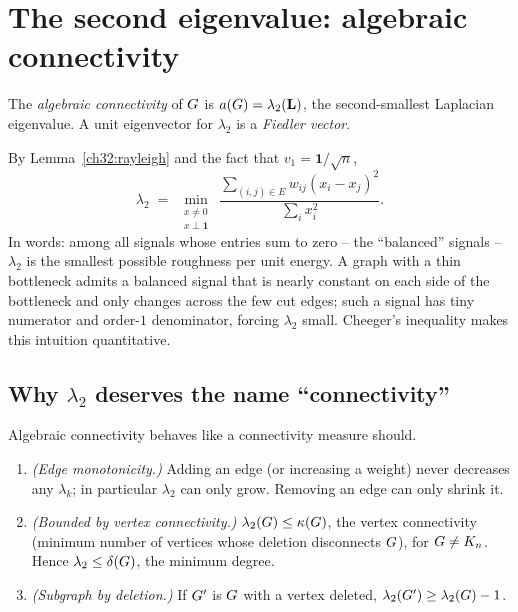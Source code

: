\section{The second eigenvalue: algebraic connectivity}
\label{ch32:fiedler}

\begin{definition}
\label{ch32:def-fiedler}
The \emph{algebraic connectivity} of $G$ is $a(G)=\lambda_2(\mathbf{L})$, the second-smallest Laplacian eigenvalue. A unit eigenvector for $\lambda_2$ is a \emph{Fiedler vector}.
\end{definition}

By Lemma~\ref{ch32:rayleigh} and the fact that $v_1=\mathbf{1}/\sqrt n$,
\begin{equation}
\label{ch32:lambda2-var}
  \lambda_2 \;=\; \min_{\substack{x\ne 0\\ x\perp\mathbf{1}}}\ \frac{\sum_{(i,j)\in E} w_{ij}(x_i-x_j)^2}{\sum_i x_i^2}.
\end{equation}
In words: among all signals whose entries sum to zero -- the ``balanced'' signals -- $\lambda_2$ is the smallest possible roughness per unit energy. A graph with a thin bottleneck admits a balanced signal that is nearly constant on each side of the bottleneck and only changes across the few cut edges; such a signal has tiny numerator and order-$1$ denominator, forcing $\lambda_2$ small. Cheeger's inequality makes this intuition quantitative.

\subsection{Why $\lambda_2$ deserves the name ``connectivity''}

\begin{proposition}
\label{ch32:monotone}
Algebraic connectivity behaves like a connectivity measure should.
\begin{enumerate}
  \item \emph{(Edge monotonicity.)} Adding an edge (or increasing a weight) never decreases any $\lambda_k$; in particular $\lambda_2$ can only grow. Removing an edge can only shrink it.
  \item \emph{(Bounded by vertex connectivity.)} $\lambda_2(G)\le \kappa(G)$, the vertex connectivity (minimum number of vertices whose deletion disconnects $G$), for $G\ne K_n$. Hence $\lambda_2\le \delta(G)$, the minimum degree.
  \item \emph{(Subgraph by deletion.)} If $G'$ is $G$ with a vertex deleted, $\lambda_2(G')\ge \lambda_2(G)-1$.
\end{enumerate}
\end{proposition}

